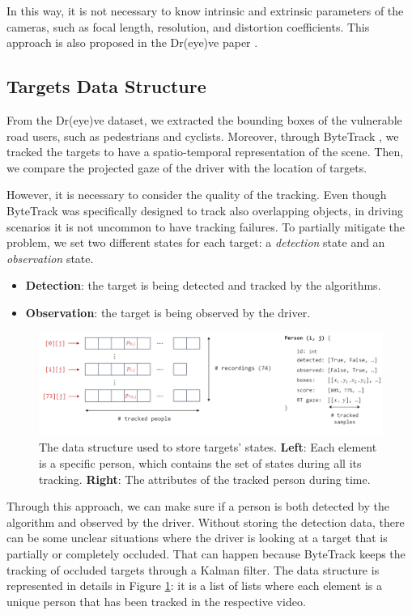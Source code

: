 In this way, it is not necessary to know intrinsic and extrinsic parameters of 
the cameras, such as focal length, resolution, and distortion coefficients. 
This approach is also proposed in the Dr(eye)ve paper \cite{dreyeve}.


\subsection{Targets Data Structure}
From the Dr(eye)ve dataset, we extracted the bounding boxes of the vulnerable 
road users, such as pedestrians and cyclists.
Moreover, through ByteTrack \cite{bytetrack}, we tracked the targets to have a 
spatio-temporal representation of the scene. Then, we compare the projected gaze 
of the driver with the location of targets. 

However, it is necessary to consider the quality of the tracking. Even though 
ByteTrack was specifically designed to track also overlapping objects, in driving 
scenarios it is not uncommon to have tracking failures. To partially mitigate 
the problem, we set two different states for each target: a 
\emph{detection} state and an \emph{observation} state.
\begin{itemize}
    \addtolength\itemsep{-2mm}
    \item \textbf{Detection}: the target is being detected and tracked by the algorithms.
    \item \textbf{Observation}: the target is being observed by the driver.
\end{itemize}

\begin{figure}
\centering
\includegraphics[width=\textwidth]{images/dreyeve/targets_data.png}
\caption{The data structure used to store targets' states.
\textbf{Left}: Each element is a specific person, which contains the set of 
states during all its tracking.
\textbf{Right}: The attributes of the tracked person during time.
}
\label{fig:targets_data_structure}
\end{figure}
Through this approach, we can make sure if a person is both detected by the 
algorithm and observed by the driver. Without storing the detection data, there 
can be some unclear situations where the driver is looking at a target that is 
partially or completely occluded. That can happen because ByteTrack keeps the 
tracking of occluded targets through a Kalman filter. 
The data structure is represented in details 
in Figure \ref{fig:targets_data_structure}: it is a list of lists where each 
element is a unique person that has been tracked in the respective video.

